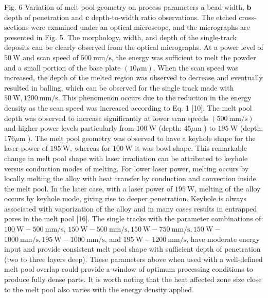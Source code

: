 \documentclass[10pt]{article}
\begin{document}
Fig. 6 Variation of melt pool geometry on process parameters a bead width, $\mathbf{b}$ depth of penetration and $\mathbf{c}$ depth-to-width ratio observations. The etched cross-sections were examined under an optical microscope, and the micrographs are presented in Fig. 5. The morphology, width, and depth of the single-track deposits can be clearly observed from the optical micrographs. At a power level of $50 \mathrm{~W}$ and scan speed of $500 \mathrm{~mm} / \mathrm{s}$, the energy was sufficient to melt the powder and a small portion of the base plate $(10 \mu \mathrm{m})$. When the scan speed was increased, the depth of the melted region was observed to decrease and eventually resulted in balling, which can be observed for the single track made with $50 \mathrm{~W}, 1200 \mathrm{~mm} / \mathrm{s}$. This phenomenon occurs due to the reduction in the energy density as the scan speed was increased according to Eq. 1 [10]. The melt pool depth was observed to increase significantly at lower scan speeds $(500 \mathrm{~mm} / \mathrm{s})$ and higher power levels particularly from $100 \mathrm{~W}$ (depth: $45 \mu \mathrm{m}$ ) to $195 \mathrm{~W}$ (depth: $176 \mu \mathrm{m}$ ). The melt pool geometry was observed to have a keyhole shape for the laser power of $195 \mathrm{~W}$, whereas for $100 \mathrm{~W}$ it was bowl shape. This remarkable change in melt pool shape with laser irradiation can be attributed to keyhole versus conduction modes of melting. For lower laser power, melting occurs by locally melting the alloy with heat transfer by conduction and convection inside the melt pool. In the later case, with a laser power of $195 \mathrm{~W}$, melting of the alloy occurs by keyhole mode, giving rise to deeper penetration. Keyhole is always associated with vaporization of the alloy and in many cases results in entrapped pores in the melt pool [16]. The single tracks with the parameter combinations of: $100 \mathrm{~W}-500 \mathrm{~mm} / \mathrm{s}$, $150 \mathrm{~W}-500 \mathrm{~mm} / \mathrm{s}, 150 \mathrm{~W}-750 \mathrm{~mm} / \mathrm{s}, 150 \mathrm{~W}-$ $1000 \mathrm{~mm} / \mathrm{s}, 195 \mathrm{~W}-1000 \mathrm{~mm} / \mathrm{s}$, and $195 \mathrm{~W}-1200 \mathrm{~mm} / \mathrm{s}$, have moderate energy input and provide consistent melt pool shape with sufficient depth of penetration (two to three layers deep). These parameters above when used with a well-defined melt pool overlap could provide a window of optimum processing conditions to produce fully dense parts. It is worth noting that the heat affected zone size close to the melt pool also varies with the energy density applied.
\end{document}
